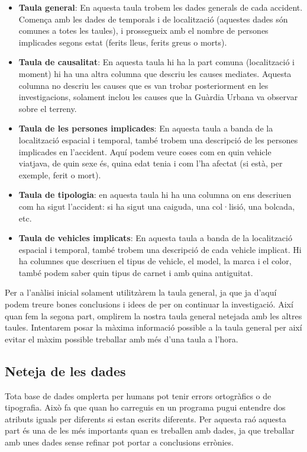 \begin{itemize}


\item \textbf{Taula general}: En aquesta taula trobem les dades generals de cada accident. Comença amb les dades de temporals i de localització (aquestes dades són comunes a totes les taules), i prossegueix amb el nombre de persones implicades segons estat (ferits lleus, ferits greus o morts).
\item \textbf{Taula de causalitat}: En aquesta taula hi ha la part comuna (localització i moment) hi ha una altra columna que descriu les causes mediates. Aquesta columna no descriu les causes que es van trobar posteriorment en les investigacions, solament inclou les causes que la Guàrdia Urbana va observar sobre el terreny.
\item \textbf{Taula de les persones implicades}: En aquesta taula a banda de la localització espacial i temporal, també trobem una descripció de les persones implicades en l'accident. Aquí podem veure coses com en quin vehicle viatjava, de quin sexe és, quina edat tenia i com l'ha afectat (si està, per exemple, ferit o mort).
\item \textbf{Taula de tipologia}: en aquesta taula hi ha una columna on ens descriuen com ha sigut l'accident: si ha sigut una caiguda, una col·lisió, una bolcada, etc.
\item \textbf{Taula de vehicles implicats}: En aquesta taula a banda de la localització espacial i temporal, també trobem una descripció de cada vehicle implicat. Hi ha columnes que descriuen el tipus de vehicle, el model, la marca i el color, també podem saber quin tipus de carnet i amb quina antiguitat.

\end{itemize}
Per a l'anàlisi inicial solament utilitzàrem la taula general, ja que ja d'aquí podem treure bones conclusions i idees de per on continuar la investigació. Així quan fem la segona part, omplirem la nostra taula general netejada amb les altres taules. Intentarem posar la màxima informació possible a la taula general per així evitar el màxim possible treballar amb més d'una taula a l'hora.

\subsection{Neteja de les dades}
Tota base de dades omplerta per humans pot tenir errors ortogràfics o de tipografia. Això fa que quan ho carreguis en un programa pugui entendre dos atributs iguals per diferents si estan escrits diferents. Per aquesta raó aquesta part és una de les més importants quan es treballen amb dades, ja que treballar amb unes dades sense refinar pot portar a conclusions errònies.

